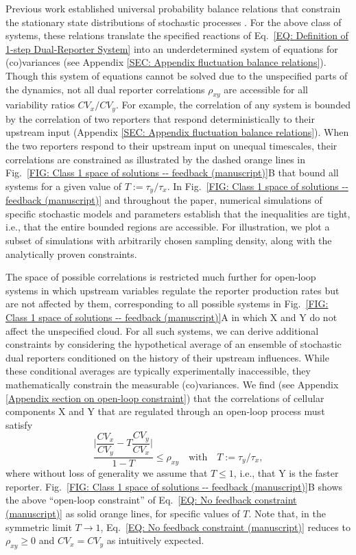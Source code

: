 \documentclass[%
 reprint,prx,
superscriptaddress,
%
%
%
%
%
%
%
%
%
 amsmath,amssymb,
 aps,
%
%
%
%
%
%
]{revtex4-2}
\begin{document}
{Previous work established universal probability balance relations that constrain the stationary state distributions of stochastic processes \cite{hilfinger2015a}. For the above class of systems, these relations translate the  specified reactions of Eq.~\eqref{EQ: Definition of 1-step Dual-Reporter System} into an underdetermined system of equations for  (co)variances (see Appendix \ref{SEC: Appendix fluctuation balance relations})}. Though this system of equations cannot be solved due to the unspecified parts of the dynamics, not all dual reporter correlations $\rho_{xy}$ are accessible for all variability ratios $CV_x/CV_y$. For example, the correlation of any system is bounded by the correlation of two reporters that respond deterministically to their upstream input (Appendix \ref{SEC: Appendix fluctuation balance relations}). When the two reporters respond to their upstream input on unequal timescales, their correlations are constrained as illustrated by the dashed orange lines in Fig.~\ref{FIG: Class 1 space of solutions -- feedback (manuscript)}B that bound all systems for a given value of $T:= \tau_y/\tau_x$. {In Fig.~\ref{FIG: Class 1 space of solutions -- feedback (manuscript)} and throughout the paper, numerical simulations of specific stochastic models and parameters establish that the inequalities are tight, i.e., that the entire bounded regions are accessible. For illustration, we plot a subset of simulations with arbitrarily chosen sampling density, along with the analytically proven constraints.}
%
%
%
%
%


The space of possible correlations is restricted much further for open-loop systems in which upstream variables regulate the reporter production rates but are not affected by them, corresponding to all possible systems in  Fig.~\ref{FIG: Class 1 space of solutions -- feedback (manuscript)}A in which X and Y do not affect the unspecified cloud. 
{For all such systems, we can derive additional constraints by considering the hypothetical average of an ensemble of stochastic dual reporters conditioned on the history of their upstream influences.
%
%
While these conditional averages are typically experimentally inaccessible, they mathematically constrain the measurable (co)variances}. We find  {(see Appendix \ref{Appendix section on open-loop constraint})} that the correlations of cellular components X and Y that are regulated through an open-loop process must satisfy
\begin{equation}
\frac{\Big|\dfrac{CV_{x}}{CV_{y}}  - T\dfrac{CV_{y}}{CV_{x}}\Big|}{1-T}  \leqslant  \rho_{xy}  \quad \text{with} \quad T:= \tau_y/\tau_x,
\label{EQ: No feedback constraint (manuscript)}
\end{equation}
where without loss of generality we assume that $T\leqslant1$, i.e., that Y is the faster reporter. Fig.~\ref{FIG: Class 1 space of solutions -- feedback (manuscript)}B shows the above ``open-loop constraint'' of Eq.~\eqref{EQ: No feedback constraint (manuscript)} as solid orange lines, for specific values of $T$. Note that, in the symmetric limit  $T\to1$, Eq.~\eqref{EQ: No feedback constraint (manuscript)} reduces to $\rho_{xy} \geqslant 0$ and $CV_{x} = CV_{y}$ as intuitively expected.
\end{document}
